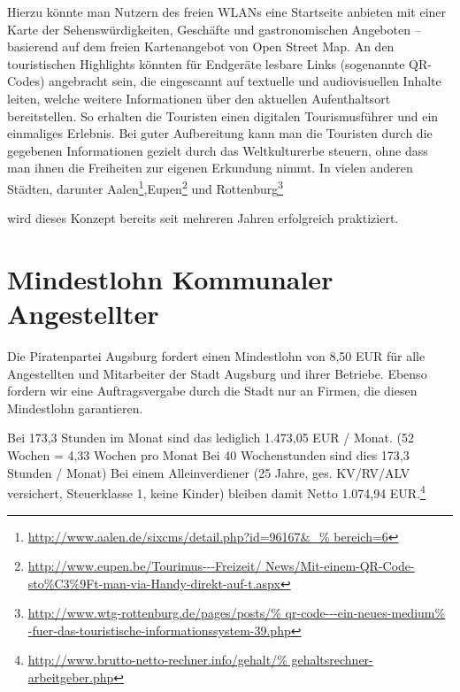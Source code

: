   Hierzu könnte man Nutzern des freien WLANs eine Startseite anbieten mit 
  einer Karte der Sehenswürdigkeiten, Geschäfte und gastronomischen Angeboten 
  -- basierend auf dem freien Kartenangebot von Open Street Map. An den 
  touristischen Highlights könnten für Endgeräte lesbare Links (sogenannte 
  QR-Codes) angebracht sein, die eingescannt auf textuelle und audiovisuellen 
  Inhalte leiten, welche weitere Informationen über den aktuellen 
  Aufenthaltsort bereitstellen. So erhalten die Touristen einen digitalen 
  Tourismusführer und ein einmaliges Erlebnis. Bei guter Aufbereitung kann man 
  die Touristen durch die gegebenen Informationen gezielt durch das 
  Weltkulturerbe steuern, ohne dass man ihnen die Freiheiten zur eigenen 
  Erkundung nimmt. In vielen anderen Städten, darunter 
  Aalen\footnote{\url{http://www.aalen.de/sixcms/detail.php?id=96167\&_%
  bereich=6}},Eupen\footnote{\url{http://www.eupen.be/Tourimus---Freizeit/
  News/Mit-einem-QR-Code-sto\%C3\%9Ft-man-via-Handy-direkt-auf-t.aspx}} und 
  Rottenburg\footnote{\url{http://www.wtg-rottenburg.de/pages/posts/%
  qr-code---ein-neues-medium%
  -fuer-das-touristische-informationssystem-39.php}}
   
  wird dieses Konzept bereits seit mehreren Jahren erfolgreich praktiziert.
  
  \section{Mindestlohn Kommunaler Angestellter}
  
  Die Piratenpartei Augsburg fordert einen Mindestlohn von 8,50 EUR für alle 
  Angestellten und Mitarbeiter der Stadt Augsburg und ihrer Betriebe. Ebenso 
  fordern wir eine Auftragsvergabe durch die Stadt nur an Firmen, die diesen 
  Mindestlohn garantieren.
  
  Bei 173,3 Stunden im Monat sind das lediglich 1.473,05 EUR / Monat. (52 
  Wochen = 4,33 Wochen pro Monat Bei 40 Wochenstunden sind dies 173,3 Stunden 
  / Monat) Bei einem Alleinverdiener (25 Jahre, ges. KV/RV/ALV versichert, 
  Steuerklasse 1, keine Kinder) bleiben damit Netto 1.074,94 
  EUR.\footnote{\url{http://www.brutto-netto-rechner.info/gehalt/%
      gehaltsrechner-arbeitgeber.php}}